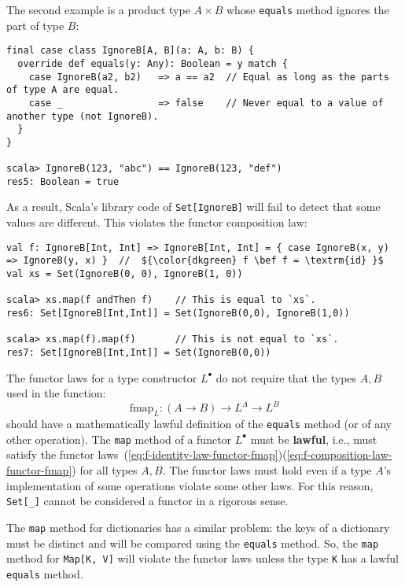 The second example is a product type $A\times B$ whose \lstinline!equals!
method ignores the part of type $B$:
\begin{lstlisting}
final case class IgnoreB[A, B](a: A, b: B) {
  override def equals(y: Any): Boolean = y match {
    case IgnoreB(a2, b2)   => a == a2  // Equal as long as the parts of type A are equal.
    case _                 => false    // Never equal to a value of another type (not IgnoreB).
  }
}

scala> IgnoreB(123, "abc") == IgnoreB(123, "def")
res5: Boolean = true
\end{lstlisting}
As a result, Scala\textsf{'}s library code of \lstinline!Set[IgnoreB]! will
fail to detect that some values are different. This violates the functor
composition law:
\begin{lstlisting}[mathescape=true]
val f: IgnoreB[Int, Int] => IgnoreB[Int, Int] = { case IgnoreB(x, y) => IgnoreB(y, x) }  //  ${\color{dkgreen} f \bef f = \textrm{id} }$
val xs = Set(IgnoreB(0, 0), IgnoreB(1, 0))

scala> xs.map(f andThen f)    // This is equal to `xs`.
res6: Set[IgnoreB[Int,Int]] = Set(IgnoreB(0,0), IgnoreB(1,0))

scala> xs.map(f).map(f)       // This is not equal to `xs`.
res7: Set[IgnoreB[Int,Int]] = Set(IgnoreB(0,0))
\end{lstlisting}

The functor laws for a type constructor $L^{\bullet}$ do not require
that the types $A,B$ used in the function:
\[
\text{fmap}_{L}:\left(A\rightarrow B\right)\rightarrow L^{A}\rightarrow L^{B}
\]
should have a mathematically lawful definition of the \lstinline!equals!
method (or of any other operation). The \lstinline!map! method of
a functor $L^{\bullet}$ must be \textbf{lawful},
i.e., must satisfy the functor laws~(\ref{eq:f-identity-law-functor-fmap})\textendash (\ref{eq:f-composition-law-functor-fmap})
for all types $A,B$. The functor laws must hold even if a type $A$\textsf{'}s
implementation of some operations violate some other laws. For this
reason, \lstinline!Set[_]! cannot be considered a functor in a rigorous
sense.

The \lstinline!map! method for dictionaries has a similar problem:
the keys of a dictionary must be distinct and will be compared using
the \lstinline!equals! method. So, the \lstinline!map! method for
\lstinline!Map[K, V]! will violate the functor laws unless the type
\lstinline!K! has a lawful \lstinline!equals! method.

